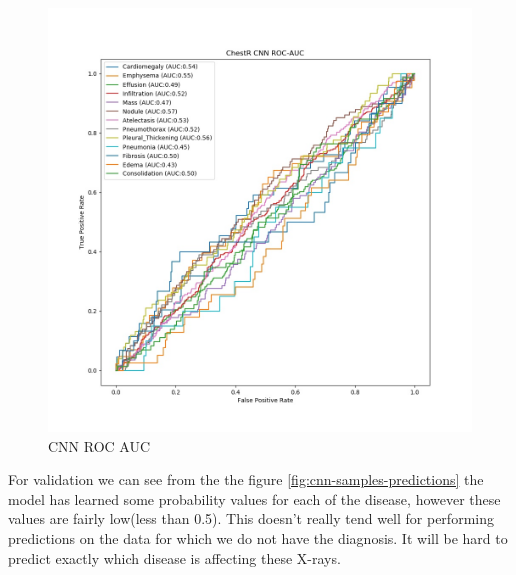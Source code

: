 \documentclass{article}
\begin{document}
    \begin{figure}
        \includegraphics[width=\linewidth]{./images/chestr-cnn_roc_auc.jpg}
        \caption{CNN ROC AUC}
        \label{fig:cnn-roc-auc}
    \end{figure}

    For validation we can see from the the figure \ref{fig:cnn-samples-predictions} the model has learned some probability values for each of the disease, however these values are fairly low(less than 0.5). This doesn't really tend well for performing predictions on the data for which we do not have the diagnosis. It will be hard to predict exactly which disease is affecting these X-rays. 
    
\end{document}
